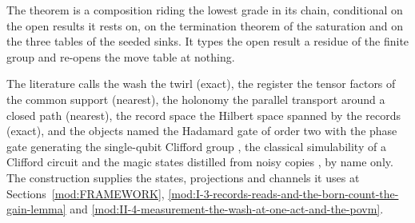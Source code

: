The theorem is a composition riding the lowest grade in its chain, conditional on the open results it rests on, on the termination theorem of the saturation and on the three tables of the seeded sinks. It types the open result a residue of the finite group and re-opens the move table at nothing.
\begin{chbridge}
The literature calls the wash the twirl (exact), the register the tensor factors of the common support (nearest), the holonomy the parallel transport around a closed path (nearest), the record space the Hilbert space spanned by the records (exact), and the objects named the Hadamard gate of order two with the phase gate generating the single-qubit Clifford group \cite{Nielsen2000}, the classical simulability of a Clifford circuit \cite{Gottesman1998} and the magic states distilled from noisy copies \cite{BravyiKitaev2005}, by name only. The construction supplies the states, projections and channels it uses at Sections~\ref{mod:FRAMEWORK}, \ref{mod:I-3-records-reads-and-the-born-count-the-gain-lemma} and \ref{mod:II-4-measurement-the-wash-at-one-act-and-the-povm}.
\end{chbridge}
